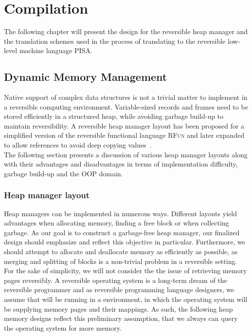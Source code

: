 \chapter{Compilation}
The following chapter will present the design for the reversible heap manager and the translation schemes used in the process of translating \rooplpp to the reversible low-level machine language \textsc{PISA}.

\section{Dynamic Memory Management}
Native support of complex data structures is not a trivial matter to implement in a reversible computing environment. Variable-sized records and frames need to be stored efficiently in a structured heap, while avoiding garbage build-up to maintain reversibility. A reversible heap manager layout has been proposed for a simplified version of the reversible functional language \textsc{RFun} and later expanded to allow references to avoid deep copying values~\cite{ha:heap, ty:rfun, tm:refcounting}.\\

The following section presents a discussion of various heap manager layouts along with their advantages and disadvantages in terms of implementation difficulty, garbage build-up and the OOP domain. 

\subsection{Heap manager layout}
Heap managers can be implemented in numerous ways. Different layouts yield advantages when allocating memory, finding a free block or when collecting garbage. As our goal is to construct a garbage-free heap manager, our finalized design should emphasize and reflect this objective in particular. Furthermore, we should attempt to allocate and deallocate memory as efficiently as possible, as merging and splitting of blocks is a non-trivial problem in a reversible setting.\\

For the sake of simplicity, we will not consider the the issue of retrieving memory pages reversibly. A reversible operating system is a long-term dream of the reversible programmer and as reversible programming language designers, we assume that \rooplpp will be running in a  environment, in which the operating system will be supplying memory pages and their mappings. As such, the following heap memory designs reflect this preliminary assumption, that we always can query the operating system for more memory. \\


